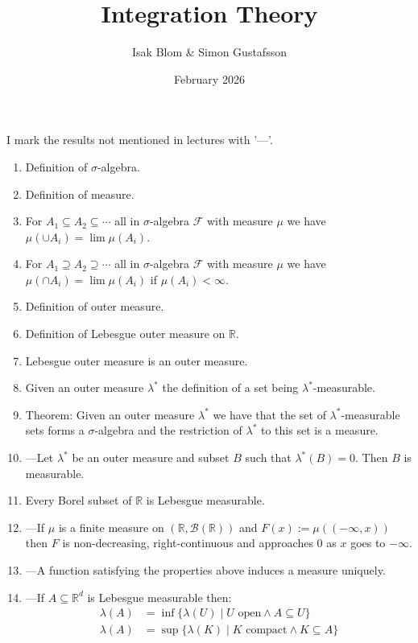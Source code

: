 \documentclass{article}
\title{Integration Theory}
\author{Isak Blom \& Simon Gustafsson}
\date{February 2026}
\begin{document}
\maketitle
I mark the results not mentioned in lectures with '---'.
\begin{enumerate}
\section{Del I}
    \item Definition of $\sigma$-algebra.
    \item Definition of measure.
    \item For $A_1 \subseteq A_2 \subseteq \cdots$ all in $\sigma$-algebra $\mathcal{F}$ with measure $\mu$ we have $\mu(\cup A_i) = \lim\mu(A_i)$.
    \item For $A_1 \supseteq A_2 \supseteq \cdots$ all in $\sigma$-algebra $\mathcal{F}$ with measure $\mu$ we have $\mu(\cap A_i) = \lim\mu(A_i)$ if $\mu(A_i) < \infty$.
    \item Definition of outer measure.
    \item Definition of Lebesgue outer measure on $\mathbb{R}$.
    \item Lebesgue outer measure is an outer measure.
    \item Given an outer measure $\lambda^*$ the definition of a set being $\lambda^*$-measurable.
    \item Theorem: Given an outer measure $\lambda^*$ we have that the set of $\lambda^*$-measurable sets forms a $\sigma$-algebra and the restriction of $\lambda^*$ to this set is a  measure.
    \item ---Let $\lambda^*$ be an outer measure and subset $B$ such that $\lambda^*(B) = 0$. Then $B$ is measurable.
    \item Every Borel subset of $\mathbb{R}$ is Lebesgue measurable. 
    \item ---If $\mu$ is a finite measure on $(\mathbb{R},\mathscr{B}(\mathbb{R}))$ and $F(x) := \mu((-\infty,x))$ then $F$ is non-decreasing, right-continuous and approaches $0$ as $x$ goes to $-\infty$.
    \item ---A function satisfying the properties above induces a measure uniquely.
    \item ---If $A\subseteq \mathbb{R}^d$ is Lebesgue measurable then: \begin{align*}
        \lambda(A) &= \inf\{\lambda(U)\mid U \text{ open}\wedge A\subseteq U\}\\
        \lambda(A) &= \sup\{\lambda(K)\mid K \text{ compact}\wedge K\subseteq A\}

\end{align*}
\end{enumerate}
\end{document}
